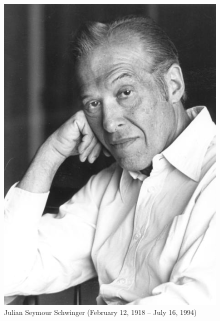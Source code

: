 \begin{refsection}



\begin{figure}
   \centering
   \includegraphics[scale=.35]{./Images/schwinger}
   \caption{Julian Seymour Schwinger (February 12, 1918 -- July 16, 1994) }
\end{figure}

\printbibliography[heading=subbibliography]
\end{refsection}
